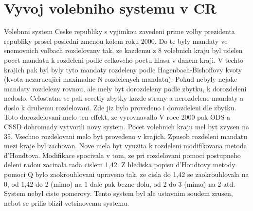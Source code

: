 \documentclass[12pt,a4paper]{article}
\begin{document}
\section{Vyvoj volebniho systemu v CR}
Volebnni system Ceske republiky s vyjimkou zavedeni prime volby prezidenta republiky prosel posledni zmenou kolem roku 2000. Do te byly mandaty ve snemovnich volbach rozdelovany tak, ze kazdemu z 8 volebnich kraju byl udelen pocet mandatu k rozdeleni podle celkoveho poctu hlasu v danem kraji. V techto krajich pak byl byly tyto mandaty rozdeleny podle Hagenbach-Bishoffovy kvoty (kvota nezarucujici maximalne N rozdelenych mandatu). Pokud nebyly nejake mandaty rozdeleny rovnou, ale mely byt dorozdeleny podle zbytku, k dorozdeleni nedoslo. Celostatne se pak secetly zbytky kazde strany a nerozdelene mandaty a doslo k druhemu rozdelovani. Zde jiz bylo provedeno i dorozdeleni dle zbytku. Toto dorozdelovani melo ten effekt, ze vyrovnavallo %
V roce 2000 pak ODS a CSSD dohromady vytvorili novy system. Pocet volebnich kraju mel byt zvysen na 35. Vsechno rozdelovani melo byt provedeno v krajich. Zpusob rozdeleni mandatu mezi kraje byl zachovan. Nove mela byt vyuzita k rozdeleni modifikovana metoda d'Hondtova. Modifikace spocivala v tom, ze pri rozdelovani pomoci postupneho deleni radou zacinala rada cislem 1,42. Z hlediska popisu d'Hondtovy metody pomoci Q bylo zaokrouhlovani upraveno tak, ze cisla do 1,42 se zaokrouhlovala na 0, od 1,42 do 2 (mimo) na 1 dale pak bezne dolu, od 2 do 3 (mimo) na 2 atd. System nebyl ciste pomerovy. Tento system byl ale ustavnim soudem zrusen, nebot se prilis blizil vetsinovemu systemu.  
\end{document}
